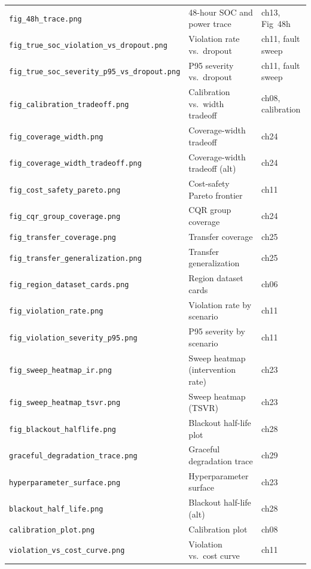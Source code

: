 \begin{small}
\begin{longtable}{@{}p{3.8cm}p{4.2cm}p{3.2cm}@{}}
\texttt{fig\_48h\_trace.png} & 48-hour SOC and power trace & ch13, Fig~48h \\
\texttt{fig\_true\_soc\_violation\_vs\_dropout.png} & Violation rate vs.\ dropout & ch11, fault sweep \\
\texttt{fig\_true\_soc\_severity\_p95\_vs\_dropout.png} & P95 severity vs.\ dropout & ch11, fault sweep \\
\texttt{fig\_calibration\_tradeoff.png} & Calibration vs.\ width tradeoff & ch08, calibration \\
\texttt{fig\_coverage\_width.png} & Coverage-width tradeoff & ch24 \\
\texttt{fig\_coverage\_width\_tradeoff.png} & Coverage-width tradeoff (alt) & ch24 \\
\texttt{fig\_cost\_safety\_pareto.png} & Cost-safety Pareto frontier & ch11 \\
\texttt{fig\_cqr\_group\_coverage.png} & CQR group coverage & ch24 \\
\texttt{fig\_transfer\_coverage.png} & Transfer coverage & ch25 \\
\texttt{fig\_transfer\_generalization.png} & Transfer generalization & ch25 \\
\texttt{fig\_region\_dataset\_cards.png} & Region dataset cards & ch06 \\
\texttt{fig\_violation\_rate.png} & Violation rate by scenario & ch11 \\
\texttt{fig\_violation\_severity\_p95.png} & P95 severity by scenario & ch11 \\
\texttt{fig\_sweep\_heatmap\_ir.png} & Sweep heatmap (intervention rate) & ch23 \\
\texttt{fig\_sweep\_heatmap\_tsvr.png} & Sweep heatmap (TSVR) & ch23 \\
\texttt{fig\_blackout\_halflife.png} & Blackout half-life plot & ch28 \\
\texttt{graceful\_degradation\_trace.png} & Graceful degradation trace & ch29 \\
\texttt{hyperparameter\_surface.png} & Hyperparameter surface & ch23 \\
\texttt{blackout\_half\_life.png} & Blackout half-life (alt) & ch28 \\
\texttt{calibration\_plot.png} & Calibration plot & ch08 \\
\texttt{violation\_vs\_cost\_curve.png} & Violation vs.\ cost curve & ch11 \\
\end{longtable}
\end{small}

